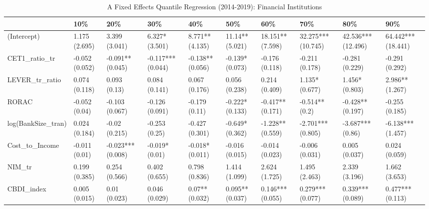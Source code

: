 \begin{table}[ht]
\centering
\caption{A Fixed Effects Quantile Regression (2014-2019): Financial Institutions} 
\begingroup\small
\begin{tabular}{llllllllll}
  \toprule
 & 10\% & 20\% & 30\% & 40\% & 50\% & 60\% & 70\% & 80\% & 90\% \\ 
  \midrule
(Intercept) & 1.175 (2.695) & 3.399 (3.041) & 6.327* (3.501) & 8.771** (4.135) & 11.14** (5.021) & 18.151** (7.598) & 32.275*** (10.745) & 42.536*** (12.496) & 64.442*** (18.441) \\ 
  CET1\_ratio\_tr & -0.052 (0.052) & -0.091** (0.045) & -0.117*** (0.044) & -0.138** (0.056) & -0.139* (0.073) & -0.176 (0.118) & -0.211 (0.178) & -0.281 (0.229) & -0.291 (0.292) \\ 
  LEVER\_tr\_ratio & 0.074 (0.118) & 0.093 (0.13) & 0.084 (0.141) & 0.067 (0.176) & 0.056 (0.238) & 0.214 (0.409) & 1.135* (0.677) & 1.456* (0.803) & 2.986** (1.267) \\ 
  RORAC & -0.052 (0.04) & -0.103 (0.067) & -0.126 (0.091) & -0.179 (0.11) & -0.222* (0.133) & -0.417** (0.171) & -0.514** (0.2) & -0.428** (0.197) & -0.255 (0.185) \\ 
  log(BankSize\_tran) & 0.024 (0.184) & -0.02 (0.215) & -0.253 (0.25) & -0.427 (0.301) & -0.649* (0.362) & -1.228** (0.559) & -2.701*** (0.805) & -3.687*** (0.86) & -6.138*** (1.457) \\ 
  Cost\_to\_Income & -0.011 (0.01) & -0.023*** (0.008) & -0.019* (0.01) & -0.018* (0.011) & -0.016 (0.015) & -0.014 (0.023) & -0.006 (0.031) & 0.005 (0.037) & 0.024 (0.059) \\ 
  NIM\_tr & 0.199 (0.385) & 0.254 (0.566) & 0.402 (0.655) & 0.798 (0.836) & 1.414 (1.099) & 2.624 (1.725) & 1.495 (2.463) & 2.339 (3.196) & 1.662 (3.653) \\ 
  CBDI\_index & 0.005 (0.015) & 0.01 (0.023) & 0.046 (0.029) & 0.07** (0.032) & 0.095** (0.037) & 0.146*** (0.055) & 0.279*** (0.077) & 0.339*** (0.089) & 0.477*** (0.113) \\ 
   \bottomrule
\end{tabular}
\endgroup
\end{table}
